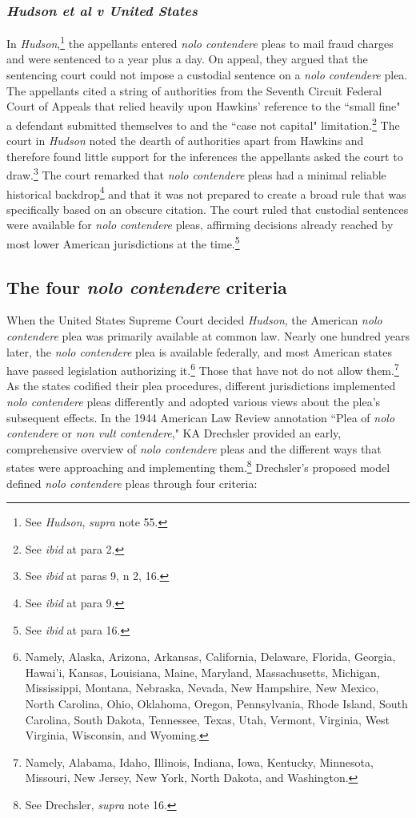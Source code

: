 \subsubsection{\textit{Hudson et al v United States}}

In \textit{Hudson},\footnote{See \textit{Hudson}, \textit{supra} note 55.} the appellants entered \textit{nolo contendere} pleas to mail fraud charges and were sentenced to a year plus a day. On appeal, they argued that the sentencing court could not impose a custodial sentence on a \textit{nolo contendere} plea. The appellants cited a string of authorities from the Seventh Circuit Federal Court of Appeals that relied heavily upon Hawkins' reference to the ``small fine" a defendant submitted themselves to and the ``case not capital" limitation.\footnote{See \textit{ibid} at para 2.} The court in \textit{Hudson} noted the dearth of authorities apart from Hawkins and therefore found little support for the inferences the appellants asked the court to draw.\footnote{See \textit{ibid} at paras 9, n 2, 16.} The court remarked that \textit{nolo contendere} pleas had a minimal reliable historical backdrop\footnote{See \textit{ibid} at para 9.} and that it was not prepared to create a broad rule that was specifically based on an obscure citation. The court ruled that custodial sentences were available for \textit{nolo contendere} pleas, affirming decisions already reached by most lower American jurisdictions at the time.\footnote{See \textit{ibid} at para 16.}

\subsection{The four \textit{nolo contendere} criteria}

When the United States Supreme Court decided \textit{Hudson}, the American \textit{nolo contendere} plea was primarily available at common law. Nearly one hundred years later, the \textit{nolo contendere} plea is available federally, and most American states have passed legislation authorizing it.\footnote{Namely, Alaska, Arizona, Arkansas, California, Delaware, Florida, Georgia, Hawai'i, Kansas, Louisiana, Maine, Maryland, Massachusetts, Michigan, Mississippi, Montana, Nebraska, Nevada, New Hampshire, New Mexico, North Carolina, Ohio, Oklahoma, Oregon, Pennsylvania, Rhode Island, South Carolina, South Dakota, Tennessee, Texas, Utah, Vermont, Virginia, West Virginia, Wisconsin, and Wyoming.}  Those that have not do not allow them.\footnote{Namely, Alabama, Idaho, Illinois, Indiana, Iowa, Kentucky, Minnesota, Missouri, New Jersey, New York, North Dakota, and Washington.} As the states codified their plea procedures, different jurisdictions implemented \textit{nolo contendere} pleas differently and adopted various views about the plea's subsequent effects. In the 1944 American Law Review annotation ``Plea of \textit{nolo contendere} or \textit{non vult contendere}," KA Drechsler provided an early, comprehensive overview of \textit{nolo contendere} pleas and the different ways that states were approaching and implementing them.\footnote{See Drechsler, \textit{supra} note 16.} Drechsler's proposed model defined \textit{nolo contendere} pleas through four criteria:

